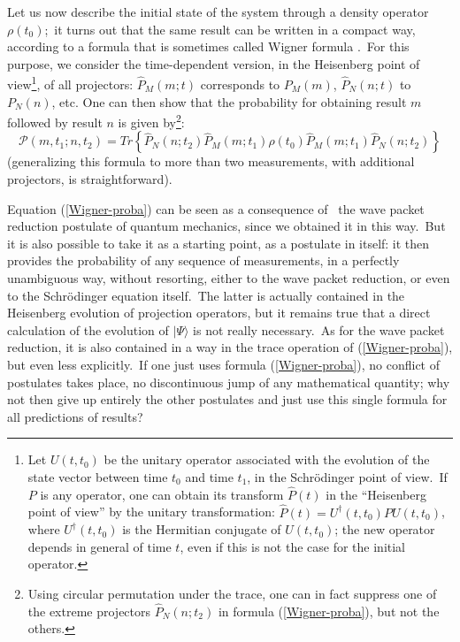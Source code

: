 \documentclass[12pt,onecolumn]{article}%
\begin{document}
Let us now describe the initial state of the system through a density operator
$\rho(t_{0})$;\ it turns out that the same result can be written in a compact
way, according to a formula that is sometimes called Wigner formula
\cite{Wigner1} \cite{Wigner-formule}.\ For this purpose, we consider the
time-dependent version, in the Heisenberg point of view\footnote{Let
$U(t,t_{0})$ be the unitary operator associated with the evolution of the
state vector between time $t_{0}$ and time $t_{1}$, in the Schr\"{o}dinger
point of view.\ If $P$ is any operator, one can obtain its transform
$\widehat{P}(t)$ in the ``Heisenberg point of view'' by the unitary
transformation: $\widehat{P}(t)=U^{\dagger}(t,t_{0})PU(t,t_{0})$, where
$U^{\dagger}(t,t_{0})$ is the Hermitian conjugate of $U(t,t_{0})$; the new
operator depends in general of time $t$, even if this is not the case for the
initial operator.}, of all projectors: $\widehat{P}_{M}(m;t)$ corresponds to
$P_{M}(m)$, $\widehat{P}_{N}(n;t)$ to $P_{N}(n)$, etc. One can then show that
the probability for obtaining result $m$ followed by result $n$ is given
by\footnote{Using circular permutation under the trace, one can in fact
suppress one of the extreme projectors $\widehat{P}_{N}(n;t_{2})$ in formula
(\ref{Wigner-proba}), but not the others.}:
\begin{equation}
\mathcal{P}(m,t_{1};n,t_{2})=Tr\left\{  \widehat{P}_{N}(n;t_{2})\widehat
{P}_{M}(m;t_{1})\rho(t_{0})\widehat{P}_{M}(m;t_{1})\widehat{P}_{N}%
(n;t_{2})\right\}  \label{Wigner-proba}%
\end{equation}
(generalizing this formula to more than two measurements, with additional
projectors, is straightforward).

Equation (\ref{Wigner-proba}) can be seen as a consequence of \ the wave
packet reduction postulate of quantum mechanics, since we obtained it in this
way.\ But it is also possible to take it as a starting point, as a postulate
in itself: it then provides the probability of any sequence of measurements,
in a perfectly unambiguous way, without resorting, either to the wave packet
reduction, or even to the Schr\"{o}dinger equation itself.\ The latter is
actually contained in the Heisenberg evolution of projection operators, but it
remains true that a direct calculation of the evolution of $|\Psi\rangle $ is not
really necessary.\ As for the wave packet reduction, it is also contained in a
way in the trace operation of (\ref{Wigner-proba}), but even less
explicitly.\ If one just uses formula (\ref{Wigner-proba}), no conflict of
postulates takes place, no discontinuous jump of any mathematical quantity;
why not then give up entirely the other postulates and just use this single
formula for all predictions of results?
\end{document}

